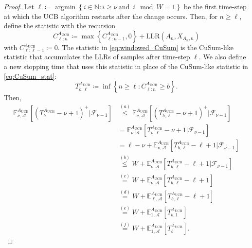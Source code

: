 \documentclass[letterpaper, 10 pt, conference]{ieeeconf}  %
\newcommand{\lp}{\left(}
\newcommand{\rp}{\right)}
\newcommand{\lb}{\left[}
\newcommand{\rb}{\right]}
\newcommand{\lbp}{\left\{}
\newcommand{\rbp}{\right\}}
\newcommand{\mcal}{\mathcal}
\newcommand{\mrm}{\mathrm}
\newcommand{\mbb}{\mathbb}
\newcommand{\E}{\mathbb{E}}
\newcommand{\argmin}{\mathop{\mathrm{argmin}}}
\begin{document}
\begin{proof}
Let $\ell \coloneqq \argmin \lbp i \in \mbb{N} : i \geq \nu \mrm{\:and}\enspace i \mod W = 1 \rbp$ be the first time-step at which the UCB algorithm restarts after the change occurs. Then, for $n \geq \ell$, define the statistic with the recursion
%
\begin{equation}\label{eq:windowed_CuSum}
    C_{\ell:n}^{A_{\mrm{UCB}}} \coloneqq \max \lbp C_{\ell:n - 1}^{A_{\mrm{UCB}}}, 0 \rbp + \mrm{LLR} \lp A_{n}, X_{A_{n},n} \rp
\end{equation}
%
with $C_{\ell: \ell - 1}^{A_{\mrm{UCB}}} \coloneqq 0$. The statistic in \eqref{eq:windowed_CuSum} is the CuSum-like statistic that accumulates the LLRs of samples after time-step $\ell$. We also define a new stopping time that uses this statistic in place of the CuSum-like statistic in \eqref{eq:CuSum_stat}:
%
\begin{equation}\label{eq:windowed_T}
    T_{b, \ell}^{A_{\mrm{UCB}}} \coloneqq \inf \lbp n \geq \ell: C_{\ell:n}^{A_{\mrm{UCB}}} \geq b \rbp.
\end{equation}
%
Then,
%
\begin{align}
    \E_{\nu,\mcal{A}}^{A_{\mrm{UCB}}} \lb \lp T_{b}^{A_{\mrm{UCB}}} - \nu + 1\rp^{+} \Big| \mcal{F}_{\nu-1} \rb &\overset{(a)}{\leq} \E_{\nu,\mcal{A}}^{A_{\mrm{UCB}}} \lb \lp T_{b, \ell}^{A_{\mrm{UCB}}} - \nu + 1\rp^{+} \Big| \mcal{F}_{\nu-1} \rb \nonumber\\
    &= \E_{\nu,\mcal{A}}^{A_{\mrm{UCB}}} \lb T_{b, \ell}^{A_{\mrm{UCB}}} - \nu + 1 \Big| \mcal{F}_{\nu-1} \rb \nonumber\\
    &= \ell - \nu + \E_{\nu,\mcal{A}}^{A_{\mrm{UCB}}} \lb T_{b, \ell}^{A_{\mrm{UCB}}} - \ell + 1 \Big| \mcal{F}_{\nu-1} \rb \nonumber\\
    &\overset{(b)}{\leq} W + \E_{\nu,\mcal{A}}^{A_{\mrm{UCB}}} \lb T_{b, \ell}^{A_{\mrm{UCB}}} - \ell + 1 \Big| \mcal{F}_{\nu-1} \rb \nonumber\\
    &\overset{(c)}{=} W + \E_{\nu,\mcal{A}}^{A_{\mrm{UCB}}} \lb T_{b, \ell}^{A_{\mrm{UCB}}} - \ell + 1 \rb \nonumber\\
    &\overset{(d)}{=} W + \E_{\ell,\mcal{A}}^{A_{\mrm{UCB}}} \lb T_{b, \ell}^{A_{\mrm{UCB}}} - \ell + 1 \rb \nonumber\\
    &\overset{(e)}{=} W + \E_{1,\mcal{A}}^{A_{\mrm{UCB}}} \lb T_{b, 1}^{A_{\mrm{UCB}}} \rb \nonumber\\
    &\overset{(f)}{=} W + \E_{1,\mcal{A}}^{A_{\mrm{UCB}}} \lb T_{b}^{A_{\mrm{UCB}}} \rb. \label{eq:CuSum_Lem1_laststep}
\end{align}

\end{proof}
\end{document}
